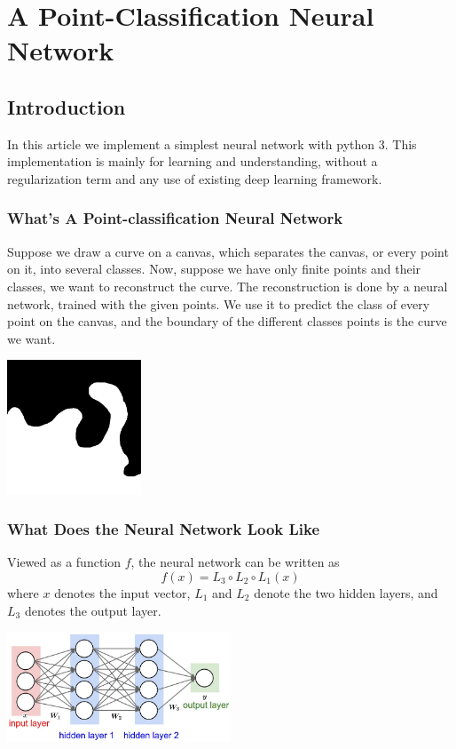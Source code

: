 \chapter{A Point-Classification Neural Network}

\section{Introduction}
In this article we implement a simplest neural network with python 3. This implementation is mainly for learning and understanding, without a regularization term and any use of existing deep learning framework.

\subsection{What's A Point-classification Neural Network}
Suppose we draw a curve on a canvas, which separates the canvas, or every point on it, into several classes. Now, suppose we have only finite points and their classes, we want to reconstruct the curve. The reconstruction is done by a neural network, trained with the given points. We use it to predict the class of every point on the canvas, and the boundary of the different classes points is the curve we want.
\begin{center}
\includegraphics[width=0.3\textwidth]{figures/pcNN_train3.png}
\end{center}

\subsection{What Does the Neural Network Look Like}
Viewed as a function $f$, the neural network can be written as
\[f(x)=L_3\circ L_2\circ L_1(x)\]
where $x$ denotes the input vector,  $L_1$ and $L_2$ denote the two hidden layers, and $L_3$ denotes the output layer.
\begin{center}
\includegraphics[width=0.5\textwidth]{figures/pcNN_Fig2}
\end{center}


